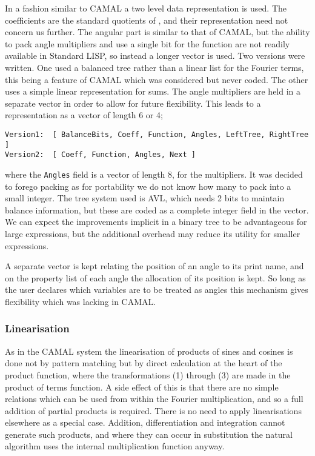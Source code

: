 In a fashion similar to CAMAL a two level data representation is used.
The coefficients are the standard quotients of \REDUCE, and their
representation need not concern us further.  The angular part is
similar to that of CAMAL, but the ability to pack angle multipliers
and use a single bit for the function are not readily available in
Standard LISP, so instead a longer vector is used.  Two versions were
written.  One used a balanced tree rather than a linear list for the
Fourier terms, this being a feature of CAMAL which was considered but
never coded.  The other uses a simple linear representation for sums.
The angle multipliers are held in a separate vector in order to allow
for future flexibility.  This leads to a representation as a vector of
length 6 or 4;
\begin{verbatim}
Version1:  [ BalanceBits, Coeff, Function, Angles, LeftTree, RightTree ]
Version2:  [ Coeff, Function, Angles, Next ]
\end{verbatim}
where the \texttt{Angles} field is a vector of length 8, for the
multipliers.  It was decided to forego packing as for portability we
do not know how many to pack into a small integer.  The tree system
used is AVL, which needs 2 bits to maintain balance information, but
these are coded as a complete integer field in the vector.  We can
expect the improvements implicit in a binary tree to be advantageous
for large expressions, but the additional overhead may reduce its
utility for smaller expressions.

A separate vector is kept relating the position of an angle to its
print name, and on the property list of each angle the allocation of
its position is kept.  So long as the user declares which variables
are to be treated as angles this mechanism gives flexibility which was
lacking in CAMAL.

\subsubsection{Linearisation}

As in the CAMAL system the linearisation of products of sines and
cosines is done not by pattern matching but by direct calculation at
the heart of the product function, where the transformations (1)
through (3) are made in the product of terms function.  A side effect
of this is that there are no simple relations which can be used from
within the Fourier multiplication, and so a full addition of partial
products is required.  There is no need to apply linearisations
elsewhere as a special case.  Addition, differentiation and
integration cannot generate such products, and where they can occur in
substitution the natural algorithm uses the internal multiplication
function anyway.

